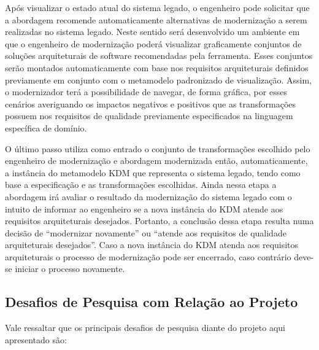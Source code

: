 \documentclass[12pt]{article}
\begin{document}
Após visualizar o estado atual do sistema legado, o engenheiro pode solicitar que a abordagem recomende automaticamente alternativas de modernização a serem realizadas no sistema legado. Neste sentido será desenvolvido um ambiente em que o engenheiro de modernização poderá visualizar graficamente conjuntos de soluções arquiteturais de software recomendadas pela ferramenta. Esses conjuntos serão montados automaticamente com base nos requisitos arquiteturais definidos previamente em conjunto com o metamodelo padronizado de visualização. Assim, o modernizador terá a possibilidade de navegar, de forma gráfica, por esses cenários averiguando os impactos negativos e positivos que as transformações possuem nos requisitos de qualidade previamente especificados na linguagem específica de domínio.

O último passo utiliza como entrado o conjunto de transformações escolhido pelo engenheiro de modernização e abordagem modernizada então, automaticamente, a instância do metamodelo KDM que representa o sistema legado, tendo como base a especificação e as transformações escolhidas. Ainda nessa etapa a abordagem irá avaliar o resultado da modernização do sistema legado com o intuito de informar ao engenheiro se a nova instância do KDM atende aos requisitos arquiteturais desejados. Portanto, a conclusão dessa etapa resulta numa decisão de ``modernizar novamente'' ou ``atende aos requisitos de qualidade arquiteturais desejados''. Caso a nova instância do KDM atenda aos requisitos arquiteturais o processo de modernização pode ser encerrado, caso contrário deve-se iniciar o processo novamente.


\subsection{Desafios de Pesquisa com Relação ao Projeto}

Vale ressaltar que os principais desafios de pesquisa diante do projeto aqui apresentado são:
\end{document}
